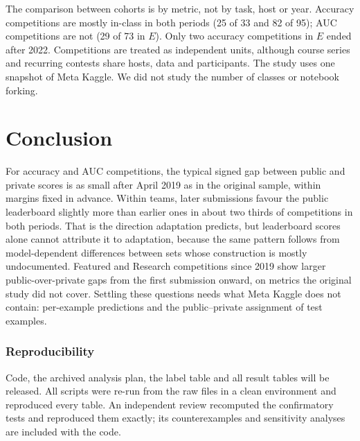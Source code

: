 \documentclass[10pt]{article}
\begin{document}
The comparison between cohorts is by metric, not by task, host or year. Accuracy competitions are mostly in-class in both periods (25 of 33 and 82 of 95); AUC competitions are not (29 of 73 in $E$). Only two accuracy competitions in $E$ ended after 2022. Competitions are treated as independent units, although course series and recurring contests share hosts, data and participants. The study uses one snapshot of Meta Kaggle. We did not study the number of classes or notebook forking.

\section{Conclusion}

For accuracy and AUC competitions, the typical signed gap between public and private scores is as small after April 2019 as in the original sample, within margins fixed in advance. Within teams, later submissions favour the public leaderboard slightly more than earlier ones in about two thirds of competitions in both periods. That is the direction adaptation predicts, but leaderboard scores alone cannot attribute it to adaptation, because the same pattern follows from model-dependent differences between sets whose construction is mostly undocumented. Featured and Research competitions since 2019 show larger public-over-private gaps from the first submission onward, on metrics the original study did not cover. Settling these questions needs what Meta Kaggle does not contain: per-example predictions and the public--private assignment of test examples.

\subsubsection*{Reproducibility}
Code, the archived analysis plan, the label table and all result tables will be released. All scripts were re-run from the raw files in a clean environment and reproduced every table. An independent review recomputed the confirmatory tests and reproduced them exactly; its counterexamples and sensitivity analyses are included with the code.



\end{document}
